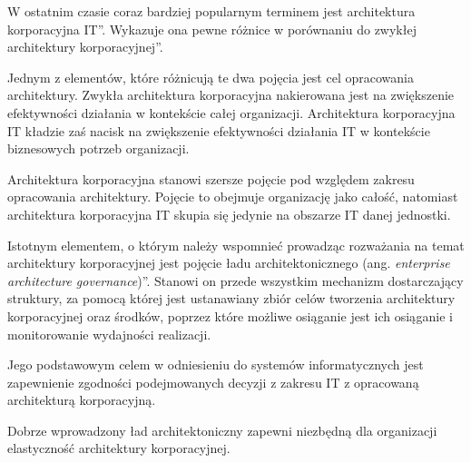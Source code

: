 W ostatnim czasie coraz bardziej popularnym terminem jest \quotedblbase architektura korporacyjna IT\textquotedblright. Wykazuje ona pewne różnice w porównaniu do \quotedblbase zwykłej architektury korporacyjnej\textquotedblright. 

Jednym z elementów, które różnicują te dwa pojęcia jest cel opracowania architektury. Zwykła architektura korporacyjna nakierowana jest na zwiększenie efektywności działania w kontekście całej organizacji. Architektura korporacyjna IT kładzie zaś nacisk na zwiększenie efektywności działania IT w kontekście biznesowych potrzeb organizacji. 

Architektura korporacyjna stanowi szersze pojęcie pod względem zakresu opracowania architektury. Pojęcie to obejmuje organizację jako całość, natomiast architektura korporacyjna IT skupia się jedynie na obszarze IT danej jednostki. 

Istotnym elementem, o którym należy wspomnieć prowadząc rozważania na temat architektury korporacyjnej jest pojęcie \quotedblbase ładu architektonicznego (ang. \emph{enterprise architecture governance})\textquotedblright. Stanowi on przede wszystkim mechanizm dostarczający struktury, za pomocą której jest ustanawiany zbiór celów tworzenia architektury korporacyjnej oraz środków, poprzez które możliwe osiąganie jest ich osiąganie i monitorowanie wydajności realizacji. 

Jego podstawowym celem w odniesieniu do systemów informatycznych jest zapewnienie zgodności podejmowanych decyzji z zakresu IT z opracowaną architekturą korporacyjną. 

Dobrze wprowadzony ład architektoniczny zapewni niezbędną dla organizacji elastyczność architektury korporacyjnej.

